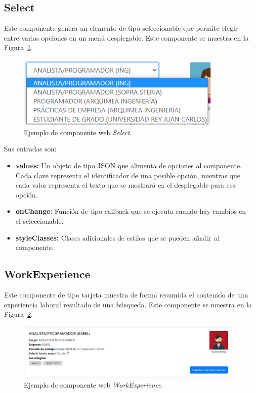 \documentclass[a4paper, 12pt]{book}
\begin{document}
    \subsection{Select}
    \label{subsec:wc_select}
    Este componente genera un elemento de tipo seleccionable que permite elegir entre varias opciones en un menú desplegable.
    Este componente se muestra en la Figura~\ref{fig:component_select}.

    \begin{figure}
        \centering
        \includegraphics[width=10cm, keepaspectratio]{img/Select.PNG}
        \caption{Ejemplo de componente web \emph{Select}.}\label{fig:component_select}
    \end{figure}

    Sus entradas son:

    \begin{itemize}
        \item \textbf{values:} Un objeto de tipo JSON que alimenta de opciones al componente. Cada clave representa el identificador de una posible opción, mientras que cada valor representa el texto que se mostrará en el desplegable para esa opción.
        \item \textbf{onChange:} Función de tipo callback que se ejecuta cuando hay cambios en el seleccionable.
        \item \textbf{styleClasses:} Clases adicionales de estilos que se pueden añadir al componente.
    \end{itemize}

    \subsection{WorkExperience}
    \label{subsec:wc_work_experience}
    Este componente de tipo tarjeta muestra de forma resumida el contenido de una experiencia laboral resultado de una búsqueda.
    Este componente se muestra en la Figura~\ref{fig:component_work_experience}.

    \begin{figure}
        \centering
        \includegraphics[width=15cm, keepaspectratio]{img/WorkExperience.PNG}
        \caption{Ejemplo de componente web \emph{WorkExperience}.}\label{fig:component_work_experience}
    \end{figure}
\end{document}
